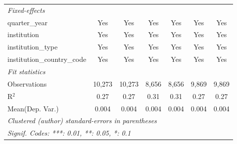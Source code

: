 \begin{tabular}{lcccccc}
   \midrule
   \emph{Fixed-effects}\\
   quarter\_year                      & Yes         & Yes        & Yes     & Yes        & Yes         & Yes\\  
   institution                        & Yes         & Yes        & Yes     & Yes        & Yes         & Yes\\  
   institution\_type                  & Yes         & Yes        & Yes     & Yes        & Yes         & Yes\\  
   institution\_country\_code         & Yes         & Yes        & Yes     & Yes        & Yes         & Yes\\  
   \midrule
   \emph{Fit statistics}\\
   Observations                       & 10,273      & 10,273     & 8,656   & 8,656      & 9,869       & 9,869\\  
   R$^2$                              & 0.27        & 0.27       & 0.31    & 0.31       & 0.27        & 0.27\\  
Mean(Dep. Var.) & 0.004 & 0.004 & 0.004 & 0.004 & 0.004 & 0.004 \\
   \midrule \midrule
   \multicolumn{7}{l}{\emph{Clustered (author) standard-errors in parentheses}}\\
   \multicolumn{7}{l}{\emph{Signif. Codes: ***: 0.01, **: 0.05, *: 0.1}}\\
\end{tabular}
\par\endgroup
